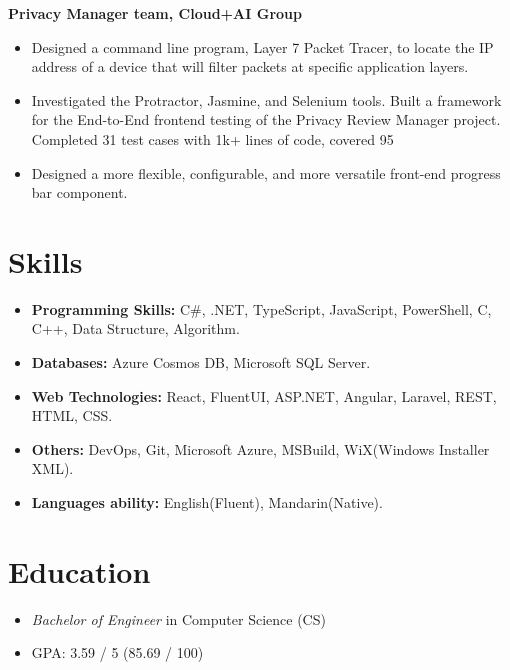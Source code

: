 \documentclass{resume}
\begin{document}
\textbf{Privacy Manager team, Cloud+AI Group}
\begin{itemize}
  \item Designed a command line program, Layer 7 Packet Tracer, to locate the IP address of a device that will filter packets at specific application layers.
  \item Investigated the Protractor, Jasmine, and Selenium tools. Built a framework for the End-to-End frontend testing of the Privacy Review Manager project. Completed 31 test cases with 1k+ lines of code, covered 95%
  \item Designed a more flexible, configurable, and more versatile front-end progress bar component.
\end{itemize}

\section{Skills}
\begin{itemize}[parsep=0.5ex]
  \item \textbf{Programming Skills:} C\#, .NET, TypeScript, JavaScript, PowerShell, C, C++, Data Structure, Algorithm. 
  \item \textbf{Databases:} Azure Cosmos DB, Microsoft SQL Server.
  \item \textbf{Web Technologies:} React, FluentUI, ASP.NET, Angular, Laravel, REST, HTML, CSS.
  \item \textbf{Others:} DevOps, Git, Microsoft Azure, MSBuild, WiX(Windows Installer XML).
  \item \textbf{Languages ability:} English(Fluent), Mandarin(Native).
\end{itemize}

\section{Education}
\begin{itemize}
  \item \textit{Bachelor of Engineer} in Computer Science (CS)
  \item GPA: 3.59 / 5 (85.69 / 100)
\end{itemize}

%
%
\end{document}
